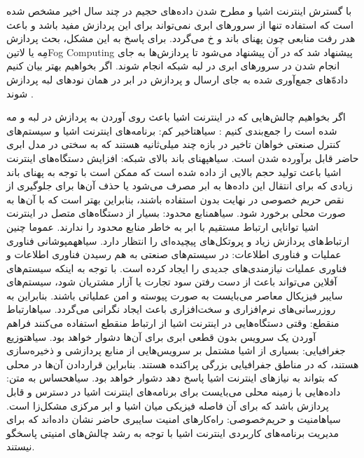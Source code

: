 
با گسترش اینترنت اشیا و مطرح شدن داده‌های حجیم در چند سال اخیر مشخص شده است که استفاده تنها از سرورهای ابری نمی‌تواند برای این پردازش مفید باشد و باعث هدر رفت منابعی چون پهنای باند و ‌خ می‌گردد.
برای پاسخ به این مشکل، بحث پردازش مِه یا ‌لاتین{Fog Computing} پیشنهاد شد که در آن پیشنهاد می‌شود تا پردازش‌ها به جای انجام شدن در سرورهای ابری در لبه شبکه انجام شوند.
اگر بخواهیم بهتر بیان کنیم داده‌ّهای جمع‌آوری شده به جای ارسال و پردازش در ابر در همان نودهای لبه پردازش شوند
.

اگر بخواهیم چالش‌هایی که در اینترنت اشیا باعث روی آوردن به پردازش در لبه و مه شده است را جمع‌بندی کنیم
:
 ‌سیاه{تاخیر کم}: برنامه‌های اینترنت اشیا و سیستم‌های کنترل صنعتی خواهان تاخیر در بازه چند میلی‌ثانیه هستند که به سختی در مدل ابری حاضر قابل برآورده شدن است.
 ‌سیاه{پهنای باند بالای شبکه}: افزایش دستگاه‌های اینترنت اشیا باعث تولید حجم بالایی از داده شده است که ممکن است با توجه به پهنای باند زیادی که برای
انتقال این داده‌ها به ابر مصرف می‌شود یا حذف آن‌ها برای جلوگیری از نقص حریم خصوصی در نهایت
بدون استفاده باشند، بنابراین بهتر است که با آن‌ها به صورت محلی برخورد شود.
 ‌سیاه{منابع محدود}: بسیار از دستگاه‌های متصل در اینترنت اشیا توانایی ارتباط مستقیم با ابر به خاطر منابع محدود را ندارند. عموما چنین ارتباط‌های پردازش زیاد و پروتکل‌های پیچیده‌ای را انتظار دارد.
 ‌سیاه{همپوشانی فناوری عملیات و فناوری اطلاعات}: در سیستم‌های صنعتی به هم رسیدن فناوری اطلاعات و فناوری عملیات نیازمندی‌های جدیدی را ایجاد کرده است. با توجه به اینکه سیستم‌های آفلاین
می‌تواند باعث از دست رفتن سود تجارت یا آزار مشتریان شود، سیستم‌های سایبر فیزیکال معاصر می‌بایست به صورت پیوسته و امن عملیاتی باشند. بنابراین به روزرسانی‌های نرم‌افزاری و سخت‌افزاری باعث ایجاد نگرانی می‌گردد.
 ‌سیاه{ارتباط منقطع}: وقتی دستگاه‌هایی در اینترنت اشیا از ارتباط منقطع استفاده می‌کنند فراهم آوردن یک سرویس بدون قطعی ابری برای آن‌ها دشوار خواهد بود.
 ‌سیاه{توزیع جغرافیایی}: بسیاری از اشیا مشتمل بر سرویس‌هایی از منابع پردازشی و ذخیره‌سازی هستند، که در مناطق جفرافیایی بزرگی پراکنده هستند. بنابراین قراردادن آن‌ها در محلی که بتواند به نیازهای اینترنت اشیا پاسخ دهد
دشوار خواهد بود.
 ‌سیاه{حساس به متن}: داده‌هایی با زمینه محلی می‌بایست برای برنامه‌های اینترنت اشیا در دسترس و قابل پردازش باشد که برای آن فاصله فیزیکی میان اشیا و ابر مرکزی مشکل‌زا است.
 ‌سیاه{امنیت و حریم‌خصوصی}: راه‌کارهای امنیت سایبری حاضر نشان داده‌اند که برای مدیریت برنامه‌های کاربردی اینترنت اشیا با توجه به رشد چالش‌های امنیتی پاسخگو نیستند.

